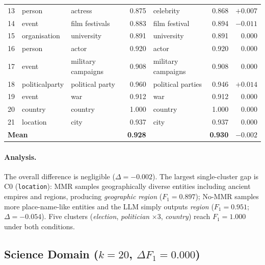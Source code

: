 \documentclass[11pt,a4paper]{article}
\begin{document}
\begin{table}[h]
\begin{tabular}{r l l r l r r}
13 & person        & actress            & \cellcolor{red!15}0.875 & celebrity        & \cellcolor{red!15}0.868 & $+0.007$ \\
14 & event         & film festivals     & \cellcolor{red!15}0.883 & film festival    & \cellcolor{red!15}0.894 & $-0.011$ \\
15 & organisation  & university         & \cellcolor{red!15}0.891 & university       & \cellcolor{red!15}0.891 & $0.000$ \\
16 & person        & actor              & \cellcolor{yellow!25}0.920 & actor            & \cellcolor{yellow!25}0.920 & $0.000$ \\
17 & event         & military campaigns & \cellcolor{yellow!25}0.908 & military campaigns & \cellcolor{yellow!25}0.908 & $0.000$ \\
18 & politicalparty& political party    & \cellcolor{yellow!25}0.960 & political parties & \cellcolor{yellow!25}0.946 & $+0.014$ \\
19 & event         & war                & \cellcolor{yellow!25}0.912 & war              & \cellcolor{yellow!25}0.912 & $0.000$ \\
20 & country       & country            & \cellcolor{green!15}1.000 & country          & \cellcolor{green!15}1.000 & $0.000$ \\
21 & location      & city               & \cellcolor{yellow!25}0.937 & city             & \cellcolor{yellow!25}0.937 & $0.000$ \\
\midrule
\multicolumn{2}{l}{\textbf{Mean}} &
  & \textbf{0.928} & & \textbf{0.930} & $-0.002$ \\
\bottomrule
\end{tabular}
\end{table}

\paragraph{Analysis.}
The overall difference is negligible ($\Delta = -0.002$).
The largest single-cluster gap is C0 (\texttt{location}): MMR samples geographically diverse entities including ancient empires and regions, producing \textit{geographic region} ($F_1 = 0.897$); No-MMR samples more place-name-like entities and the LLM simply outputs \textit{region} ($F_1 = 0.951$; $\Delta = -0.054$).
Five clusters (\textit{election}, \textit{politician} $\times 3$, \textit{country}) reach $F_1 = 1.000$ under both conditions.

\FloatBarrier

\subsection{Science Domain ($k = 20$, $\Delta F_1 = 0.000$)}
\end{document}
